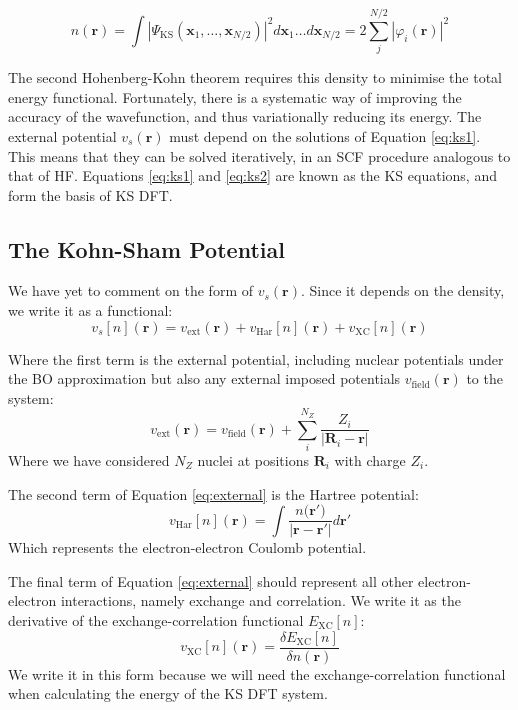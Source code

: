\begin{equation}
n(\bm{r}) = \int |\Psi_{\text{KS}}(\bm{x}_1,\ldots,\bm{x}_{N/2})|^2 d\bm{x}_1\ldots d \bm{x}_{N/2} = 2\sum_j^{N/2} |\varphi_i(\bm{r})|^2
\label{eq:ks2}
\end{equation}

The second Hohenberg-Kohn theorem requires this density to minimise the total energy functional. Fortunately, there is a systematic way of improving the accuracy of the wavefunction, and thus variationally reducing its energy. The external potential $v_s(\bm{r})$ must depend on the solutions of Equation \ref{eq:ks1}. This means that they can be solved iteratively, in an SCF procedure analogous to that of HF. Equations \ref{eq:ks1} and \ref{eq:ks2} are known as the KS equations, and form the basis of KS DFT.

\subsection{The Kohn-Sham Potential}

We have yet to comment on the form of $v_s(\bm{r})$. Since it depends on the density, we write it as a functional:
\begin{equation}
    v_s[n](\bm{r}) = v_{\text{ext}}(\bm{r}) + v_{\text{Har}}[n](\bm{r}) + v_{\text{XC}}[n](\bm{r})
    \label{eq:external}
\end{equation}

Where the first term is the external potential, including nuclear potentials under the BO approximation but also any external imposed potentials $v_{\text{field}}(\bm{r})$ to the system:
\begin{equation}
    v_{\text{ext}}(\bm{r}) = v_{\text{field}}(\bm{r}) + \sum_i^{N_Z} \frac{Z_i}{|\bm{R}_i - \bm{r}|}
    \label{eq:ext_decomp}
\end{equation}
Where we have considered $N_Z$ nuclei at positions $\bm{R}_i$ with charge $Z_i$.

The second term of Equation \ref{eq:external} is the Hartree potential:
\begin{equation}
    v_{\text{Har}}[n](\bm{r}) = \int \frac{n({\bm{r}')}}{|\bm{r} - \bm{r}'|}d\bm{r}'
\end{equation}
Which represents the electron-electron Coulomb potential.

The final term of Equation \ref{eq:external} should represent all other electron-electron interactions, namely exchange and correlation. We write it as the derivative of the exchange-correlation functional $E_{\text{XC}}[n]$:
\begin{equation}
    v_{\text{XC}}[n](\bm{r}) = \frac{\delta E_{\text{XC}}[n]}{\delta n(\bm{r})}
\end{equation}
We write it in this form because we will need the exchange-correlation functional when calculating the energy of the KS DFT system.

